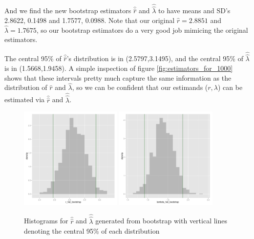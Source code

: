 \documentclass[12pt,titlepage]{article}\usepackage{graphicx, color}
\newenvironment{knitrout}{}{} %
\begin{document}
And we find the new bootstrap estimators $\hat{\hat{r}}$ and $\hat{\hat{\lambda}}$ to have means and SD's 2.8622, 0.1498 and 1.7577, 0.0988. Note that our original $\hat{r} = 2.8851$ and $\hat{\lambda} = 1.7675$, so our bootstrap estimators do a very good job mimicing the original estimators. 

The central 95\% of $\hat{\hat{r}}$'s distribution is in (2.5797,3.1495), and the central 95\% of $\hat{\hat{\lambda}}$ is in (1.5668,1.9458). A simple inspection of figure \ref{fig:estimators_for_1000} shows that these intervals pretty much capture the same information as the distribution of $\hat{r}$ and $\hat{\lambda}$, so we can be confident that our estimands ($r,\lambda$) can be estimated via $\hat{\hat{r}}$ and $\hat{\hat{\lambda}}$.

\begin{figure}[ht!]
\centering
\begin{knitrout}
\color{fgcolor}\includegraphics[width=0.45\textwidth]{figure/bootStrapPlots} 
\end{knitrout}
\begin{knitrout}
\color{fgcolor}\includegraphics[width=0.45\textwidth]{figure/bootStrapPlots2} 
\end{knitrout}

\caption{Histograms for $\hat{\hat{r}}$ and $\hat{\hat{\lambda}}$ generated from bootstrap with vertical lines denoting the central 95\% of each distribution}
\label{fig:bootstrap_estimators_for_1000}
\end{figure}
\end{document}
